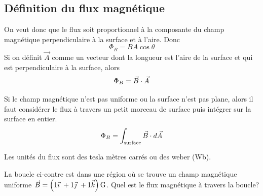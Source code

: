 \subsection*{Définition du flux magnétique}

On veut donc que le flux soit proportionnel à la composante du champ magnétique
perpendiculaire à la surface et à l'aire. Donc
$$\Phi_B = BA\cos\theta$$
Si on définit $\vec{A}$ comme un vecteur dont la longueur est l'aire de la
surface et qui est perpendiculaire à la surface, alors
$$\Phi_B = \vB \cdot \vec{A}$$

Si le champ magnétique n'est pas uniforme ou la surface n'est pas plane, alors
il faut considérer le flux à travers un petit morceau de surface puis intégrer
sur la surface en entier.
$$\Phi_B = \int_\mathrm{surface} \vB \cdot d\vec{A}$$

Les unités du flux sont des tesla mètres carrés ou des weber (Wb).







\begin{diapobox}
  La boucle ci-contre est dans une région où se trouve un champ magnétique
  uniforme $\vB = \left(\vecxyz{1}{1}{1}\right) \si{G}$. Quel est le flux
  magnétique à travers la boucle?
\end{diapobox}

